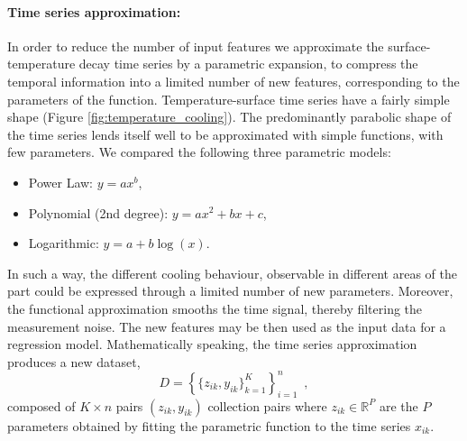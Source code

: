 \paragraph{Time series approximation:}

In order to reduce the number of input features we approximate the surface-temperature decay time series by a parametric expansion,  to compress the temporal information into a limited number of new features, corresponding to the parameters of the function. Temperature-surface time series have a fairly simple shape (Figure \ref{fig:temperature_cooling}). The predominantly parabolic shape of the time series lends itself well to be approximated with simple functions, with few parameters. We compared the following three parametric models:
\begin{itemize}
    \item Power Law: $y=ax^b$,
    \item Polynomial (2nd degree): $y=ax^2+bx+c$,
    \item Logarithmic: $y=a+b\log(x)$.
\end{itemize}

In such a way, the different cooling behaviour, observable in different areas of the part could be expressed through a limited number of new parameters. Moreover, the functional approximation smooths the time signal, thereby filtering the measurement noise. The new features may be then used as the input data for a regression model. 
Mathematically speaking, the time series approximation produces a new dataset,
%
\begin{equation*}
    D = \left\{\{z_{ik},y_{ik}\}_{k=1}^K\right\}_{i=1}^n
    \enspace,
\end{equation*}
%
composed of $K\times n$ pairs $(z_{ik},y_{ik})$ collection pairs where ${z}_{ik} \in \mathds{R}^{P}$ are the $P$ parameters obtained by fitting the parametric function to the time series $x_{ik}$.

